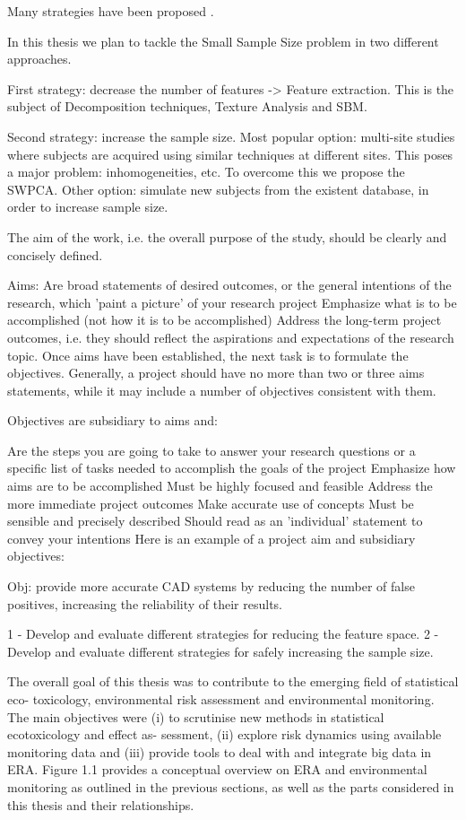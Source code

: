 Many strategies have been proposed . 

In this thesis we plan to tackle the Small Sample Size problem in two different approaches. 


First strategy: decrease the number of features -> Feature extraction. This is the subject of Decomposition techniques, Texture Analysis and \ac{SBM}. 

Second strategy: increase the sample size. Most popular option: multi-site studies where subjects are acquired using similar techniques at different sites. This poses a major problem: inhomogeneities, etc. To overcome this we propose the \ac{SWPCA}. Other option: simulate new subjects from the existent database, in order to increase sample size.



The aim of the work, i.e. the overall purpose of the study, should be clearly and concisely defined.

Aims:
Are broad statements of desired outcomes, or the general intentions of the research, which 'paint a picture' of your research project
Emphasize what is to be accomplished (not how it is to be accomplished)
Address the long-term project outcomes, i.e. they should reflect the aspirations and expectations of the research topic.
Once aims have been established, the next task is to formulate the objectives. Generally, a project should have no more than two or three aims statements, while it may include a number of objectives consistent with them.

Objectives are subsidiary to aims and:

Are the steps you are going to take to answer your research questions or a specific list of tasks needed to accomplish the goals of the project
Emphasize how aims are to be accomplished
Must be highly focused and feasible
Address the more immediate project outcomes
Make accurate use of concepts
Must be sensible and precisely described
Should read as an 'individual' statement to convey your intentions
Here is an example of a project aim and subsidiary objectives:


Obj: provide more accurate CAD systems by reducing the number of false positives, increasing the reliability of their results. 

1 - Develop and evaluate different strategies for reducing the feature space. 
2 - Develop and evaluate different strategies for safely increasing the sample size. 

The overall goal of this thesis was to contribute to the emerging field of statistical eco-
toxicology, environmental risk assessment and environmental monitoring. The main
objectives were (i) to scrutinise new methods in statistical ecotoxicology and effect as-
sessment, (ii) explore risk dynamics using available monitoring data and (iii) provide
tools to deal with and integrate big data in ERA. Figure 1.1 provides a conceptual
overview on ERA and environmental monitoring as outlined in the previous sections,
as well as the parts considered in this thesis and their relationships.

